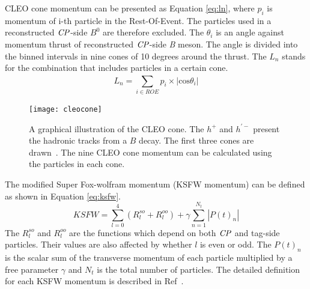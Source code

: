CLEO cone momentum can be presented as Equation \ref{eq:ln}, where $ p_i $ is momentum of i-th particle in the Rest-Of-Event. The particles used in a reconstructed $\it{CP}$-side $B^0$ are therefore excluded. The $\theta_i$ is an angle against momentum thrust of reconstructed $\it{CP}$-side \textit{B} meson. The angle is divided into the binned intervals in nine cones of 10 degrees around the thrust.  The $L_n$ stands for the combination that includes particles in a certain cone.  
\begin{equation}\label{eq:ln}
L_n = \sum_{i\in ROE}^{} p_i \times |\text{cos}\theta_i|
\end{equation}

\begin{figure}[htpb]
\centering
\texttt{[image: cleocone]}
\caption{A graphical illustration of the CLEO cone. The $h^+$ and $h^{'-}$ present the hadronic tracks from a $B$ decay. The first three cones are drawn~\cite{Bevan_2014}. The nine CLEO cone momentum can be calculated using the particles in each cone. }
\label{fig:cleocone}
\end{figure}
The modified Super Fox-wolfram momentum (KSFW momentum) can be defined as shown in Equation \ref{eq:ksfw}.
\begin{equation}\label{eq:ksfw}
KSFW = \sum_{l=0}^{4}( R_l^{so} + R_l^{oo}) + \gamma \sum_{n=1}^{N_t}|P(t)_n|
\end{equation} 
The $R_l^{so}$ and $R_l^{oo}$ are the functions which depend on both $\it{CP}$ and tag-side particles. Their values are also affected by whether $l$ is even or odd. The $P(t)_n$ is the scalar sum of the transverse momentum of
each particle multiplied by a free parameter $\gamma$ and $N_t$ is
the total number of particles. The detailed  definition for each KSFW momentum is described in Ref~\cite{bevan2017physics}.


